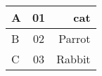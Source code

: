 \documentclass{article}
\begin{document}
  
               \begin{center}  
                    \begin{tabular}{|l|c|r|}  
                    \hline  
                          A & 01 & cat\\ \hline  
                          B & 02 & Parrot\\ \hline  
                          C & 03 & Rabbit\\ \hline  
                    \end{tabular}  
               \end{center}  
        
\end{document}
